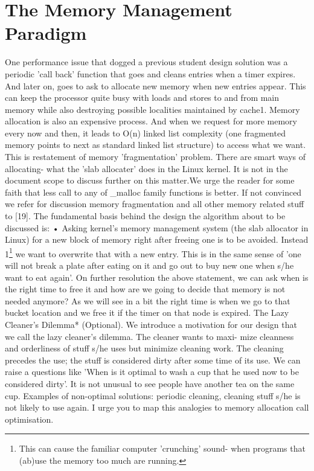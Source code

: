 \section{The Memory Management Paradigm}
One performance issue that dogged a previous student design solution was a
periodic ’call back’ function that goes and cleans entries when a timer expires. And
later on, goes to ask to allocate new memory when new entries appear. This can
keep the processor quite busy with loads and stores to and from main memory
while also destroying possible localities maintained by cache1. Memory allocation
is also an expensive process. And when we request for more memory every now
and then, it leads to O(n) linked list complexity (one fragmented memory points to
next as standard linked list structure) to access what we want. This is restatement
of memory ’fragmentation’ problem. There are smart ways of allocating- what the
’slab allocater’ does in the Linux kernel. It is not in the document scope to discuss
further on this matter.We urge the reader for some faith that less call to any of
_malloc family functions is better. If not convinced we refer for discussion memory
fragmentation and all other memory related stuff to [19].
The fundamental basis behind the design the algorithm about to be discussed
is:
• Asking kernel’s memory management system (the slab allocator in Linux)
for a new block of memory right after freeing one is to be avoided. Instead
1\footnote{This can cause the familiar computer ’crunching’ sound- when programs that (ab)use the memory
too much are running.}
we want to overwrite that with a new entry. This is in the same sense of
’one will not break a plate after eating on it and go out to buy new one
when s/he want to eat again’.
On further resolution the above statement, we can ask when is the right time to
free it and how are we going to decide that memory is not needed anymore? As we
will see in a bit the right time is when we go to that bucket location and we free it
if the timer on that node is expired.
The Lazy Cleaner’s Dilemma* (Optional). We introduce a motivation
for our design that we call the lazy cleaner’s dilemma. The cleaner wants to maxi-
mize cleanness and orderliness of stuff s/he uses but minimize cleaning work. The
cleaning precedes the use; the stuff is considered dirty after some time of its use.
We can raise a questions like ’When is it optimal to wash a cup that he used now to
be considered dirty’. It is not unusual to see people have another tea on the same
cup. Examples of non-optimal solutions: periodic cleaning, cleaning stuff s/he is
not likely to use again. I urge you to map this analogies to memory allocation call
optimisation.
